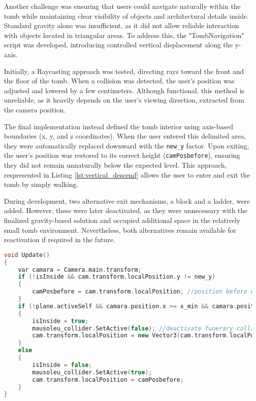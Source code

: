 Another challenge was ensuring that users could navigate naturally within the tomb while maintaining clear visibility of objects and architectural details inside. Standard gravity alone was insufficient, as it did not allow reliable interaction with objects located in triangular areas.
To address this, the "TombNavigation" script was developed, introducing controlled vertical displacement along the y-axis.

Initially, a Raycasting approach was tested, directing rays toward the front and the floor of the tomb. When a collision was detected, the user’s position was adjusted and lowered by a few centimeters. Although functional, this method is unreliable, as it heavily depends on the user’s viewing direction, extracted from the camera position.

The final implementation instead defined the tomb interior using axis-based boundaries (x, y, and z coordinates). 
When the user entered this delimited area, they were automatically replaced downward with the \texttt{new\_y} factor. Upon exiting, the user’s position was restored to its correct height (\texttt{camPosbefore}), ensuring they did not remain unnaturally below the expected level. 
This approach, respresented in Listing \ref{lst:vertical_descend} allows the user to enter and exit the tomb by simply walking.

During development, two alternative exit mechanisms, a block and a ladder, were added. However, these were later deactivated, as they were unnecessary with the finalized gravity-based solution and occupied additional space in the relatively small tomb environment. Nevertheless, both alternatives remain available for reactivation if required in the future.

\begin{lstlisting}[language=C++, caption={Vertical Descend approach in Update method().}, label={lst:vertical_descend},float]
void Update()
{
    var camara = Camera.main.transform;
    if (!isInside && cam.transform.localPosition.y != new_y)
    {
        camPosbefore = cam.transform.localPosition; //position before entering the tomb
    }
    if (!plane.activeSelf && camara.position.x >= x_min && camara.position.x <= x_max && camara.position.z <= z_max && camara.position.z >= z_min && camara.position.y <= y_max && camara.position.y >= y_min) //check if position inside the tomb
    {
        isInside = true;
        mausoleu_collider.SetActive(false); //deactivate funerary collider
        cam.transform.localPosition = new Vector3(cam.transform.localPosition.x, new_y, cam.transform.localPosition.z); //user replaced to a lower position
    }
    else
    {
        isInside = false;
        mausoleu_collider.SetActive(true);
        cam.transform.localPosition = camPosbefore;
    }
}

\end{lstlisting}
